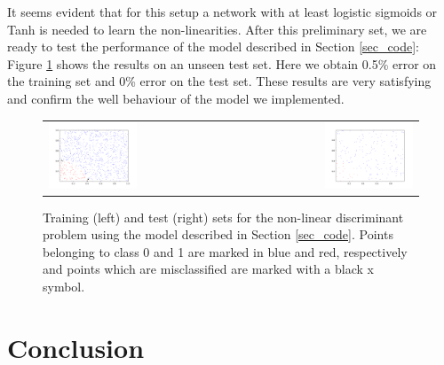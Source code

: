 \documentclass{article}
\begin{document}
It seems evident that for this setup a network with at least logistic sigmoids or Tanh is needed to learn the non-linearities.
After this preliminary set, we are ready to test the performance of  the model described in Section \ref{sec_code}: Figure \ref{fig_circle_good} shows  the results on an unseen test set. 
Here we obtain 0.5\% error on the training set and 0\% error on the test set.
These results are very satisfying and confirm the well behaviour of the model we implemented. 
  \begin{figure}[h]
 \begin{center}
\begin{tabular}{l r}
  \includegraphics[width=0.5\textwidth]{fig/fig_circ_ourmodel_05err_train} & 
  \includegraphics[width=0.5\textwidth]{fig/fig_circ_ourmodel_0err_test} \\
  \end{tabular}
   \caption{Training (left) and test (right) sets for the non-linear discriminant problem using the model described in Section \ref{sec_code}. Points belonging to class 0 and 1 are marked in blue and red, respectively and  points which are misclassified are marked with a black x symbol.  \label{fig_circle_good}}
  \end{center}
  \end{figure}

 \section{Conclusion}\label{sec_conclusion}
 
 

 
  
  
  
\end{document}
